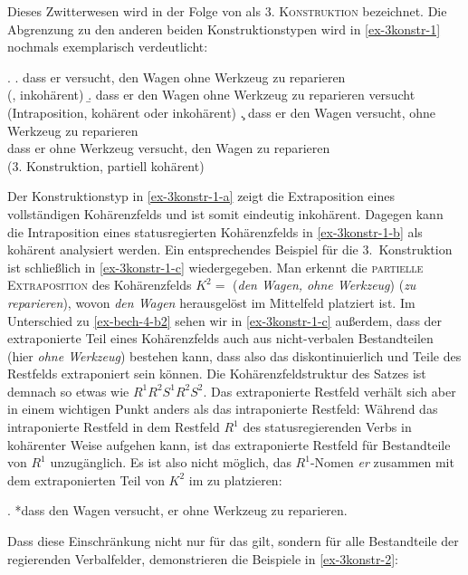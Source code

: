 Dieses Zwitterwesen wird in der Folge von \cite{denBesten:Rutten:89} als \textsc{3. Konstruktion} bezeichnet. Die Abgrenzung zu den anderen beiden Konstruktionstypen wird in \ref{ex-3konstr-1} nochmals exemplarisch verdeutlicht:

\ex. \label{ex-3konstr-1}
\a. dass er versucht, den Wagen ohne Werkzeug zu reparieren	\\
(, inkohärent) \label{ex-3konstr-1-a}	
\b. dass er den Wagen ohne Werkzeug zu reparieren versucht	\\
(Intraposition, kohärent oder inkohärent) \label{ex-3konstr-1-b}
\c. dass er den Wagen versucht, ohne Werkzeug zu reparieren \\
dass er ohne Werkzeug versucht, den Wagen zu reparieren \\
(3. Konstruktion, partiell kohärent) \label{ex-3konstr-1-c}

Der Konstruktionstyp in \ref{ex-3konstr-1-a} zeigt die Extraposition eines vollständigen Kohärenzfelds und ist somit eindeutig inkohärent. Dagegen kann die Intraposition eines statusregierten Kohärenzfelds in \ref{ex-3konstr-1-b} als kohärent analysiert werden. Ein entsprechendes Beispiel für die 3.~Konstruktion ist schlie\ss lich in \ref{ex-3konstr-1-c} wiedergegeben. Man erkennt die \textsc{partielle Extraposition} des Kohärenzfelds $K^2 =$ ({\it den Wagen, ohne Werkzeug}) ({\it zu reparieren}), wovon {\it den Wagen} herausgelöst im Mittelfeld platziert ist. Im Unterschied zu \ref{ex-bech-4-b2} sehen wir in \ref{ex-3konstr-1-c} au\ss erdem, dass der extraponierte Teil eines Kohärenzfelds auch aus nicht-verbalen Bestandteilen (hier {\it ohne Werkzeug}) bestehen kann, dass also das  diskontinuierlich und Teile des Restfelds extraponiert sein können. Die Kohärenzfeldstruktur des Satzes ist demnach so etwas wie $R^1 R^2 S^1 R^2 S^2$. Das extraponierte Restfeld verhält sich aber in einem wichtigen Punkt anders als das intraponierte Restfeld: Während das intraponierte Restfeld in dem Restfeld $R^1$ des statusregierenden Verbs in kohärenter Weise aufgehen kann, ist das extraponierte Restfeld für Bestandteile von $R^1$ unzugänglich. Es ist also nicht möglich, das $R^1$-Nomen {\it er} zusammen mit dem extraponierten Teil von $K^2$ im  zu platzieren:

\ex. *dass den Wagen versucht, er ohne Werkzeug zu reparieren. 

Dass diese Einschränkung nicht nur für das  gilt, sondern für alle Bestandteile der regierenden Verbalfelder, demonstrieren die Beispiele in \ref{ex-3konstr-2}:

